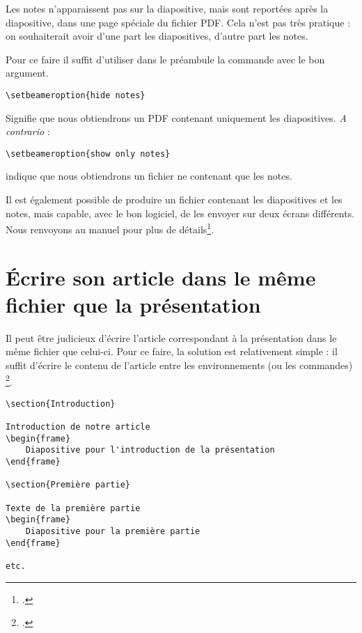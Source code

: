 Les notes n'apparaissent pas sur la diapositive, mais sont reportées après la diapositive, dans une page spéciale du fichier PDF. Cela n'est pas très pratique : on souhaiterait avoir d'une part les diapositives, d'autre part les notes. 

Pour ce faire il suffit d'utiliser dans le préambule la commande  avec le bon argument.

\begin{verbatim}
\setbeameroption{hide notes}
\end{verbatim}

Signifie que nous obtiendrons un PDF contenant uniquement les diapositives. \emph{A contrario} :
\begin{verbatim}
\setbeameroption{show only notes}
\end{verbatim}
indique que nous obtiendrons un fichier ne contenant que les notes.

Il est également possible de produire un fichier contenant les diapositives et les notes, mais capable, avec le bon logiciel, de les envoyer sur deux écrans différents. Nous renvoyons au manuel pour plus de détails\footcite{beamer_2ecrans}.

\section{Écrire son article dans le même fichier que la présentation}

Il peut être judicieux d'écrire l'article correspondant à la présentation dans le même fichier que celui-ci. Pour ce faire, la solution est relativement simple : il suffit d'écrire le contenu de l'article entre les environnements (ou les commandes) \footcite[À noter qu'on peut aussi introduire des miniatures des diapositives  dans l'article, voir :][]{beamer_diapo_article}.

\begin{verbatim}
\section{Introduction}

Introduction de notre article
\begin{frame}
	Diapositive pour l'introduction de la présentation
\end{frame}

\section{Première partie}

Texte de la première partie
\begin{frame}
	Diapositive pour la première partie
\end{frame}

etc.
\end{verbatim}


